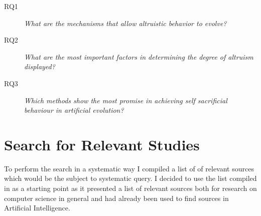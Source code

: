 \documentclass[a4paper]{book}
\begin{document}
\begin{appendices}
\begin{description}
\item[RQ1] {\it What are the mechanisms that allow altruistic behavior to evolve?} 
\item[RQ2] {\it What are the most important factors in determining the degree of altruism displayed?}
\item[RQ3] {\it Which methods show the most promise in achieving self sacrificial behaviour in artificial evolution?}

\end{description}



\section{Search for Relevant Studies}

To perform the search in a systematic way I compiled a list of of relevant sources which would be the subject to systematic query. I decided to use the list compiled in \cite{Lillegraven_design_2010} as a starting point as it presented a list of relevant sources both for research on computer science in general and had already been used to find sources in Artificial Intelligence. 



\end{appendices}
\end{document}
